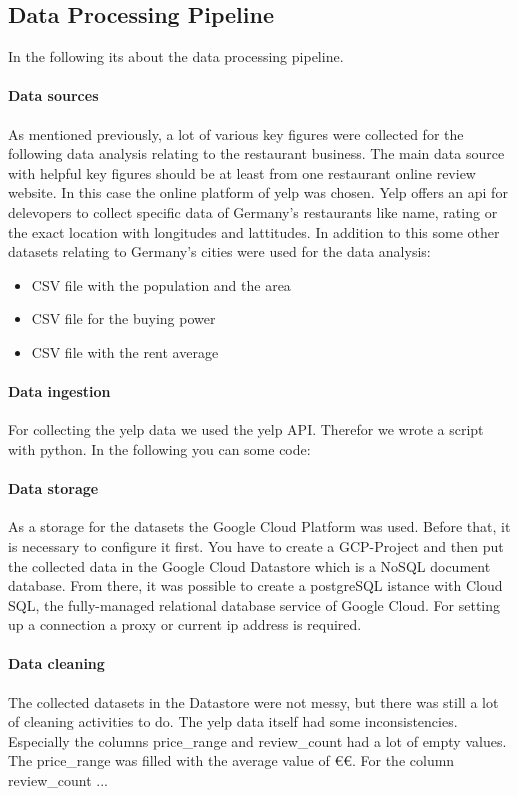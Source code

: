 \subsection{Data Processing Pipeline}
\label{subsec:pipeline}
In the following its about the data processing pipeline.

\paragraph{Data sources}
\label{subsec:Data sources}
As mentioned previously, a lot of various key figures were collected for the following data analysis relating to the restaurant business. The main data source with helpful key figures should be at least from one restaurant online review website. In this case the online platform of yelp was chosen. Yelp offers an api for delevopers to collect specific data of Germany's restaurants like name, rating or the exact location with longitudes and lattitudes.
In addition to this some other datasets relating to Germany's cities were used for the data analysis:
\begin{itemize}
\item CSV file with the population and the area
\item CSV file for the buying power
\item CSV file with the rent average
\end{itemize}

\paragraph{Data ingestion}
\label{subsec:Data ingestion}
For collecting the yelp data we used the yelp API. Therefor we wrote a script with python. In the following you can some code:

\paragraph{Data storage}
\label{subsec:Data storage}
As a storage for the datasets the Google Cloud Platform was used. Before that, it is necessary to configure it first. You have to create a GCP-Project and then put the collected data in the Google Cloud Datastore which is a NoSQL document database. From there, it was possible to create a postgreSQL istance with Cloud SQL, the fully-managed relational database service of Google Cloud. For setting up a connection a proxy or current ip address is required.

\paragraph{Data cleaning}
\label{subsec:Data cleaning}
The collected datasets in the Datastore were not messy, but there was still a lot of cleaning activities to do. The yelp data itself had some inconsistencies. Especially the columns price\_range and review\_count had a lot of empty values. The price\_range was filled with the average value of \euro\euro. For the column review\_count ...%


